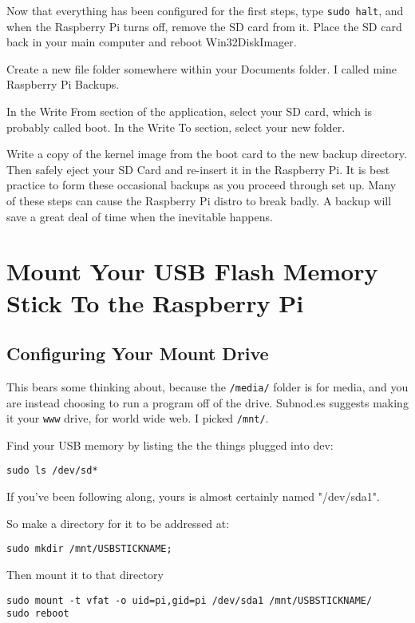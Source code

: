 Now that everything has been configured for the first steps, type \texttt{sudo halt}, and when the Raspberry Pi turns off, remove the SD card from it. Place the SD card back in your main computer and reboot Win32DiskImager.

Create a new file folder somewhere within your Documents folder. I called mine Raspberry Pi Backups.

In the Write From section of the application, select your SD card, which is probably called boot. In the Write To section, select your new folder. 

Write a copy of the kernel image from the boot card to the new backup directory. Then safely eject your SD Card and re-insert it in the Raspberry Pi. It is best practice to form these occasional backups as you proceed through set up. Many of these steps can cause the Raspberry Pi distro to break badly. A backup will save a great deal of time when the inevitable happens.

\section{Mount Your USB Flash Memory Stick To the Raspberry Pi}

\subsection{Configuring Your Mount Drive}
This bears some thinking about, because the \texttt{/media/} folder is for media, and you are instead choosing to run a program off of the drive. Subnod.es suggests making it your \texttt{www} drive, for world wide web. I picked \texttt{/mnt/}.

Find your USB memory by listing the the things plugged into dev:
\begin{lstlisting}
sudo ls /dev/sd*
\end{lstlisting}

If you've been following along, yours is almost certainly named "/dev/sda1".

So make a directory for it to be addressed at:
\begin{lstlisting}
sudo mkdir /mnt/USBSTICKNAME;
\end{lstlisting}

Then mount it to that directory
\begin{lstlisting}
sudo mount -t vfat -o uid=pi,gid=pi /dev/sda1 /mnt/USBSTICKNAME/
sudo reboot
\end{lstlisting}

